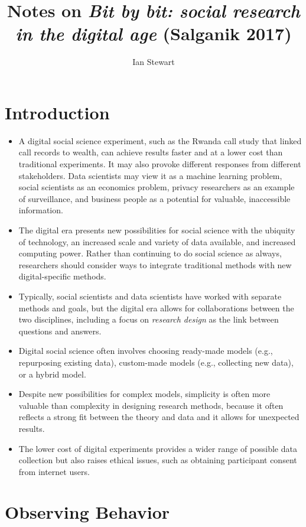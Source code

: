 \documentclass[11pt,letterpaper]{article}
\title{Notes on \textit{Bit by bit: social research in the digital age} (Salganik 2017)}
\author{Ian Stewart}
\begin{document}
\maketitle{}
\date{}

\section{Introduction}

\begin{itemize}
\item A digital social science experiment, such as the Rwanda call study that linked call records to wealth, can achieve results faster and at a lower cost than traditional experiments. It may also provoke different responses from different stakeholders. Data scientists may view it as a machine learning problem, social scientists as an economics problem, privacy researchers as an example of surveillance, and business people as a potential for valuable, inaccessible information.
\item The digital era presents new possibilities for social science with the ubiquity of technology, an increased scale and variety of data available, and increased computing power. Rather than continuing to do social science as always, researchers should consider ways to integrate traditional methods with new digital-specific methods.
\item Typically, social scientists and data scientists have worked with separate methods and goals, but the digital era allows for collaborations between the two disciplines, including a focus on \emph{research design} as the link between questions and answers. 
\item Digital social science often involves choosing ready-made models (e.g., repurposing existing data), custom-made models (e.g., collecting new data), or a hybrid model.
\item Despite new possibilities for complex models, simplicity is often more valuable than complexity in designing research methods, because it often reflects a strong fit between the theory and data and it allows for unexpected results.
\item The lower cost of digital experiments provides a wider range of possible data collection but also raises ethical issues, such as obtaining participant consent from internet users.
\end{itemize}

\section{Observing Behavior}
\end{document}
